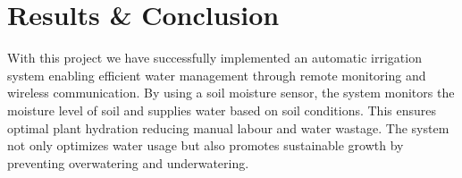 \newpage
\chapter{Results \& Conclusion}
With this project we have successfully implemented an automatic
irrigation system enabling efficient water management through remote
monitoring and wireless communication. By using a soil moisture
sensor, the system monitors the moisture level of soil and supplies
water based on soil conditions. This ensures optimal plant hydration
reducing manual labour and water wastage. The system not only
optimizes water usage but also promotes sustainable growth by
preventing overwatering and underwatering.